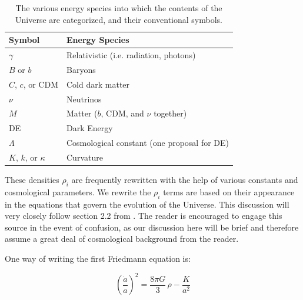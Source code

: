 
\begin{table}[htb]
\centering
\begin{tabular}{l|l}
\hline
Symbol & Energy Species \\ \hline
$\gamma$ & Relativistic (i.e. radiation, photons) \\
$B$ or $b$ & Baryons \\
$C$, $c$, or CDM & Cold dark matter \\
$\nu$ & Neutrinos \\
$M$ & Matter ($b$, CDM, and $\nu$ together) \\
DE & Dark Energy \\
$\Lambda$ & Cosmological constant (one proposal for DE) \\
$K$, $k$, or $\kappa$ & Curvature \\ \hline
\end{tabular}
 \caption[Energy species symbols]{The various energy species into which the 
 	contents of the Universe are categorized, and their conventional symbols.}
 \label{tab: species_symbols}
\end{table}


These densities $\rho_i$ are frequently rewritten with the help of various 
constants and cosmological parameters. We rewrite the $\rho_i$ terms are based 
on their appearance
in the equations that govern the evolution of the Universe. This discussion
will very closely follow section 2.2 from . The reader is
encouraged to engage this source in the event of confusion, as our discussion 
here will be brief and therefore assume a great deal of cosmological 
background from the reader.

One way of writing the first Friedmann equation is:


\begin{equation}
\label{eq: Friedmann1}
\left( \frac{\dot{a}}{a} \right)^2 = \frac{8 \pi G}{3} \, \rho - \frac{K}{a^2}
\end{equation}

